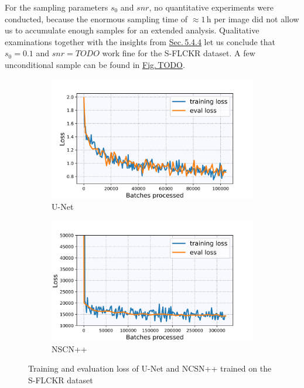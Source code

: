 For the sampling parameters $s_0$ and $snr$, no quantitative experiments were conducted, because the enormous sampling time of $\approx1$\,h per image did not allow us to accumulate enough samples for an extended analysis. Qualitative examinations together with the insights from \hyperref[sec:5.4.4]{Sec.\,5.4.4} let us conclude that $s_0=0.1$ and $snr=TODO$ work fine for the S-FLCKR dataset. A few unconditional sample can be found in \hyperref[fig:]{Fig.\,TODO}.
%
\begin{figure}[] \label{fig:3.2}
    \centering
    \begin{subfigure}[b]{0.49\textwidth}
        \includegraphics[width=\textwidth]{Chapters/figures/experiments/flickr/loss_flickr_seg.jpg}
        \caption{U-Net}
    \end{subfigure}
    \begin{subfigure}[b]{0.49\textwidth}
        \includegraphics[width=\textwidth]{Chapters/figures/experiments/flickr/loss_flickr_ncsn.jpg}
        \caption{NSCN++}
    \end{subfigure}
    \caption[Losses of U-Net/NCSN++ on S-FLCKR dataset]{Training and evaluation loss of U-Net and NCSN++ trained on the S-FLCKR dataset}
\end{figure}
